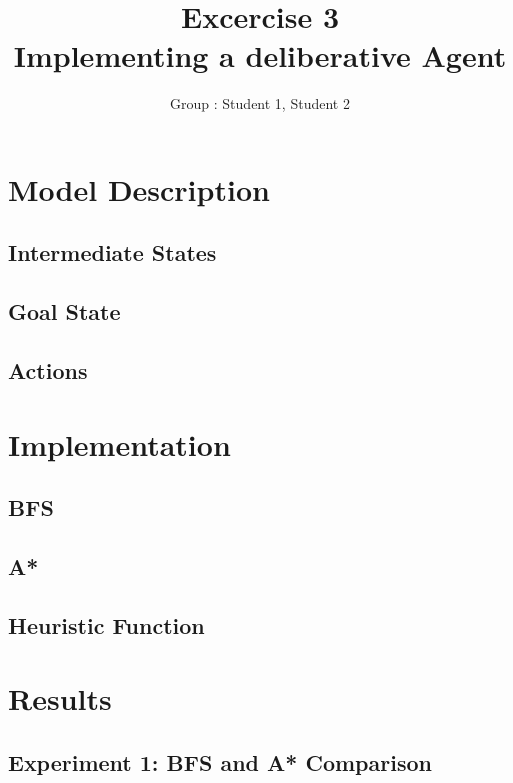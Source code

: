 \documentclass[11pt]{article}
\title{\bf Excercise 3\\ Implementing a deliberative Agent}
\author{Group \textnumero : Student 1, Student 2}
\begin{document}
\maketitle

\section{Model Description}

\subsection{Intermediate States}

\subsection{Goal State}

\subsection{Actions}


\section{Implementation}

\subsection{BFS}

\subsection{A*}

\subsection{Heuristic Function}


\section{Results}

\subsection{Experiment 1: BFS and A* Comparison}
\end{document}
